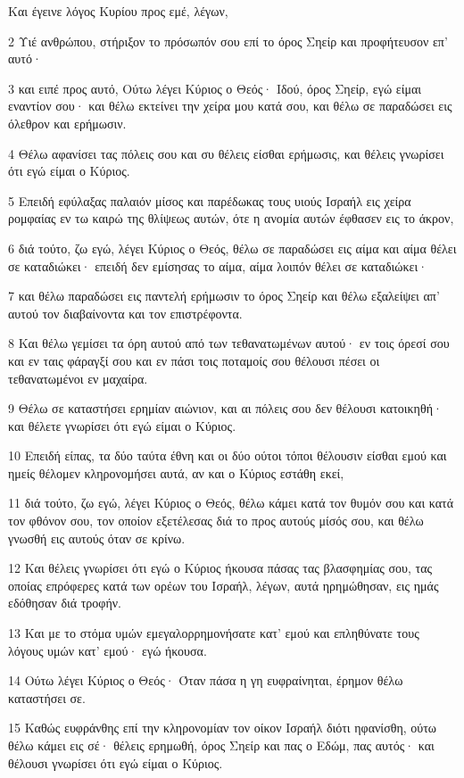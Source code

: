 \par Και έγεινε λόγος Κυρίου προς εμέ, λέγων,
\par 2 Υιέ ανθρώπου, στήριξον το πρόσωπόν σου επί το όρος Σηείρ και προφήτευσον επ' αυτό·
\par 3 και ειπέ προς αυτό, Ούτω λέγει Κύριος ο Θεός· Ιδού, όρος Σηείρ, εγώ είμαι εναντίον σου· και θέλω εκτείνει την χείρα μου κατά σου, και θέλω σε παραδώσει εις όλεθρον και ερήμωσιν.
\par 4 Θέλω αφανίσει τας πόλεις σου και συ θέλεις είσθαι ερήμωσις, και θέλεις γνωρίσει ότι εγώ είμαι ο Κύριος.
\par 5 Επειδή εφύλαξας παλαιόν μίσος και παρέδωκας τους υιούς Ισραήλ εις χείρα ρομφαίας εν τω καιρώ της θλίψεως αυτών, ότε η ανομία αυτών έφθασεν εις το άκρον,
\par 6 διά τούτο, ζω εγώ, λέγει Κύριος ο Θεός, θέλω σε παραδώσει εις αίμα και αίμα θέλει σε καταδιώκει· επειδή δεν εμίσησας το αίμα, αίμα λοιπόν θέλει σε καταδιώκει·
\par 7 και θέλω παραδώσει εις παντελή ερήμωσιν το όρος Σηείρ και θέλω εξαλείψει απ' αυτού τον διαβαίνοντα και τον επιστρέφοντα.
\par 8 Και θέλω γεμίσει τα όρη αυτού από των τεθανατωμένων αυτού· εν τοις όρεσί σου και εν ταις φάραγξί σου και εν πάσι τοις ποταμοίς σου θέλουσι πέσει οι τεθανατωμένοι εν μαχαίρα.
\par 9 Θέλω σε καταστήσει ερημίαν αιώνιον, και αι πόλεις σου δεν θέλουσι κατοικηθή· και θέλετε γνωρίσει ότι εγώ είμαι ο Κύριος.
\par 10 Επειδή είπας, τα δύο ταύτα έθνη και οι δύο ούτοι τόποι θέλουσιν είσθαι εμού και ημείς θέλομεν κληρονομήσει αυτά, αν και ο Κύριος εστάθη εκεί,
\par 11 διά τούτο, ζω εγώ, λέγει Κύριος ο Θεός, θέλω κάμει κατά τον θυμόν σου και κατά τον φθόνον σου, τον οποίον εξετέλεσας διά το προς αυτούς μίσός σου, και θέλω γνωσθή εις αυτούς όταν σε κρίνω.
\par 12 Και θέλεις γνωρίσει ότι εγώ ο Κύριος ήκουσα πάσας τας βλασφημίας σου, τας οποίας επρόφερες κατά των ορέων του Ισραήλ, λέγων, αυτά ηρημώθησαν, εις ημάς εδόθησαν διά τροφήν.
\par 13 Και με το στόμα υμών εμεγαλορρημονήσατε κατ' εμού και επληθύνατε τους λόγους υμών κατ' εμού· εγώ ήκουσα.
\par 14 Ούτω λέγει Κύριος ο Θεός· Όταν πάσα η γη ευφραίνηται, έρημον θέλω καταστήσει σε.
\par 15 Καθώς ευφράνθης επί την κληρονομίαν τον οίκον Ισραήλ διότι ηφανίσθη, ούτω θέλω κάμει εις σέ· θέλεις ερημωθή, όρος Σηείρ και πας ο Εδώμ, πας αυτός· και θέλουσι γνωρίσει ότι εγώ είμαι ο Κύριος.

